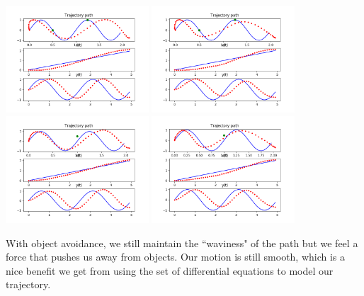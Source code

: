 \documentclass[12pt]{article}
\begin{document}
\begin{center}
	\includegraphics[width=0.4\textwidth]{linear_obstacle_avoidance_1}
	\includegraphics[width=0.4\textwidth]{regression_obstacle_avoidance_1}
	\includegraphics[width=0.4\textwidth]{linear_obstacle_avoidance_2}
	\includegraphics[width=0.4\textwidth]{regression_obstacle_avoidance_2}
\end{center}

With object avoidance, we still maintain the ``waviness" of the path but we feel a force that pushes us away from objects. Our motion is still smooth, which is a nice benefit we get from using the set of differential equations to model our trajectory. \\
\end{document}
